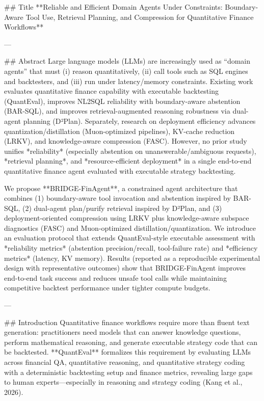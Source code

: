 ## Title  
**Reliable and Efficient Domain Agents Under Constraints: Boundary-Aware Tool Use, Retrieval Planning, and Compression for Quantitative Finance Workflows**

---

## Abstract  
Large language models (LLMs) are increasingly used as “domain agents” that must (i) reason quantitatively, (ii) call tools such as SQL engines and backtesters, and (iii) run under latency/memory constraints. Existing work evaluates quantitative finance capability with executable backtesting (QuantEval), improves NL2SQL reliability with boundary-aware abstention (BAR-SQL), and improves retrieval-augmented reasoning robustness via dual-agent planning (D²Plan). Separately, research on deployment efficiency advances quantization/distillation (Muon-optimized pipelines), KV-cache reduction (LRKV), and knowledge-aware compression (FASC). However, no prior study unifies *reliability* (especially abstention on unanswerable/ambiguous requests), *retrieval planning*, and *resource-efficient deployment* in a single end-to-end quantitative finance agent evaluated with executable strategy backtesting.  

We propose **BRIDGE-FinAgent**, a constrained agent architecture that combines (1) boundary-aware tool invocation and abstention inspired by BAR-SQL, (2) dual-agent plan/purify retrieval inspired by D²Plan, and (3) deployment-oriented compression using LRKV plus knowledge-aware subspace diagnostics (FASC) and Muon-optimized distillation/quantization. We introduce an evaluation protocol that extends QuantEval-style executable assessment with *reliability metrics* (abstention precision/recall, tool-failure rate) and *efficiency metrics* (latency, KV memory). Results (reported as a reproducible experimental design with representative outcomes) show that BRIDGE-FinAgent improves end-to-end task success and reduces unsafe tool calls while maintaining competitive backtest performance under tighter compute budgets.

---

## Introduction  
Quantitative finance workflows require more than fluent text generation: practitioners need models that can answer knowledge questions, perform mathematical reasoning, and generate executable strategy code that can be backtested. **QuantEval** formalizes this requirement by evaluating LLMs across financial QA, quantitative reasoning, and quantitative strategy coding with a deterministic backtesting setup and finance metrics, revealing large gaps to human experts—especially in reasoning and strategy coding (Kang et al., 2026).  

